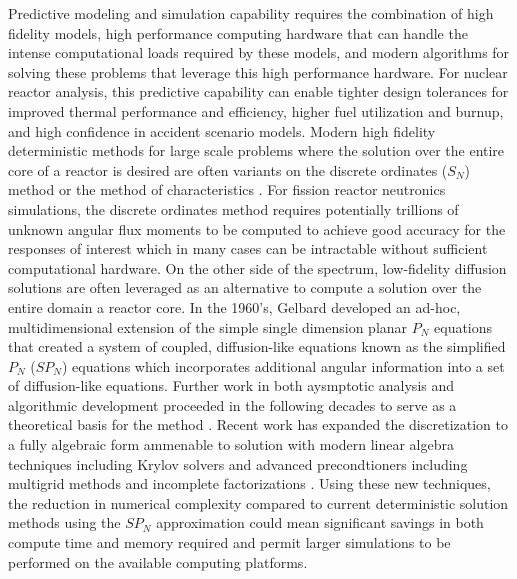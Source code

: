 \documentclass[letterpaper,11pt]{article}
\begin{document}
Predictive modeling and simulation capability requires the combination
of high fidelity models, high performance computing hardware that can
handle the intense computational loads required by these models, and
modern algorithms for solving these problems that leverage this high
performance hardware. For nuclear reactor analysis, this predictive
capability can enable tighter design tolerances for improved thermal
performance and efficiency, higher fuel utilization and burnup, and
high confidence in accident scenario models. Modern high fidelity
deterministic methods for large scale problems where the solution over
the entire core of a reactor is desired are often variants on the
discrete ordinates ($S_N$) method \cite{evans_denovo:_2010} or the
method of characteristics \cite{askew_1972}. For fission reactor
neutronics simulations, the discrete ordinates method requires
potentially trillions of unknown angular flux moments to be computed
to achieve good accuracy for the responses of interest
\cite{slaybaugh_acceleration_2011} which in many cases can be
intractable without sufficient computational hardware. On the other
side of the spectrum, low-fidelity diffusion solutions are often
leveraged as an alternative to compute a solution over the entire
domain a reactor core. In the 1960's, Gelbard developed an ad-hoc,
multidimensional extension of the simple single dimension planar $P_N$
equations that created a system of coupled, diffusion-like equations
known as the simplified $P_N$ ($SP_N$) equations \cite{gelbard_1960}
which incorporates additional angular information into a set of
diffusion-like equations. Further work in both aysmptotic analysis and
algorithmic development proceeded in the following decades to serve as
a theoretical basis for the method
\cite{morel_1996,brantley_simplified_2000}. Recent work has expanded
the discretization to a fully algebraic form ammenable to solution
with modern linear algebra techniques including Krylov solvers and
advanced precondtioners including multigrid methods and incomplete
factorizations \cite{hamilton_2014}. Using these new techniques, the
reduction in numerical complexity compared to current deterministic
solution methods using the $SP_N$ approximation could mean significant
savings in both compute time and memory required and permit larger
simulations to be performed on the available computing platforms.
\end{document}
